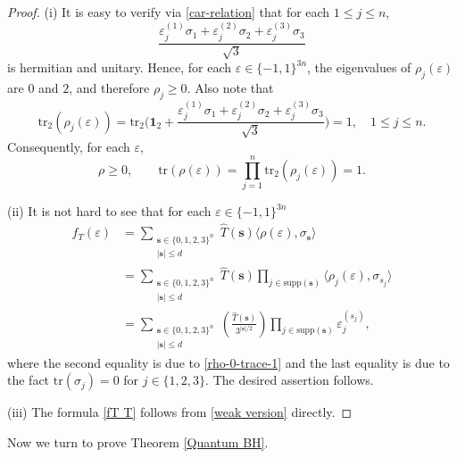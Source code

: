 \documentclass{amsbook}
\theoremstyle{definition}
\theoremstyle{remark}
\numberwithin{section}{chapter}
\numberwithin{equation}{chapter}
\newcommand{\1}{\mathbf{1}}
\newcommand{\s}{\mathbf{s}}
\begin{document}
\begin{proof}
(i) 	It is easy to verify via \eqref{car-relation} that for each $1\leq j\leq n$,
	\[\frac{\varepsilon_j^{(1)}\sigma_1+\varepsilon_j^{(2)}\sigma_2+\varepsilon_j^{(3)}\sigma_3}{\sqrt3}\]
is hermitian and unitary.  Hence, for each $\varepsilon\in \{-1,1\}^{3n}$, the eigenvalues of $\rho_j(\varepsilon)$ are \(0\) and \(2\), and therefore \(\rho_j\ge 0\). Also note that 
	\[\mathrm{tr}_2(\rho_j(\varepsilon))
	=\mathrm{tr}_2\Big(
	\mathbf{1}_2+\frac{\varepsilon_j^{(1)}\sigma_1+\varepsilon_j^{(2)}\sigma_2+\varepsilon_j^{(3)}\sigma_3}{\sqrt3}\Big)=1,\quad 1\leq j \leq n.\]
	Consequently, for each $\varepsilon$, 
	\begin{equation}\label{rho-0-trace-1}
		\rho\ge 0,\qquad
		\mathrm{tr}(\rho(\varepsilon))=\prod_{j=1}^n \mathrm{tr}_2(\rho_j(\varepsilon))=1.
	\end{equation}

(ii)  It is not hard to see that for each $\varepsilon\in \{-1,1\}^{3n}$
\begin{equation}\label{weak version}
\begin{split}
f_T(\varepsilon)&=\sum_{\substack{\mathbf{s}\in\{0,1,2,3\}^{n}\\|\mathbf{s}|\leq d}}\widehat{T}(\s)\langle \rho(\varepsilon),\sigma_{\s}\rangle\\
&=\sum_{\substack{\mathbf{s}\in\{0,1,2,3\}^{n}\\|\mathbf{s}|\leq d}}\widehat{T}(\s)\prod_{j\in\mathrm{supp}(\s)}\langle \rho_{j}(\varepsilon),\sigma_{s_j}\rangle\\
&=\sum_{\substack{\mathbf{s}\in\{0,1,2,3\}^{n}\\|\mathbf{s}|\leq d}}\left(\frac{\widehat{T}(\s)}{3^{|\s|/2}}\right)\prod_{j\in \mathrm{supp}(\s)}\varepsilon^{(s_{j})}_{j},
\end{split}
\end{equation}
where the second equality is due to \eqref{rho-0-trace-1} and the last equality is due to the fact \(\mathrm{tr}(\sigma_j)=0\) for \(j\in\{1,2,3\}\). The desired assertion follows. 

(iii) The formula \eqref{fT T} follows from \eqref{weak version} directly. 
\end{proof}


Now we turn to prove Theorem \ref{Quantum BH}. 
\end{document}
